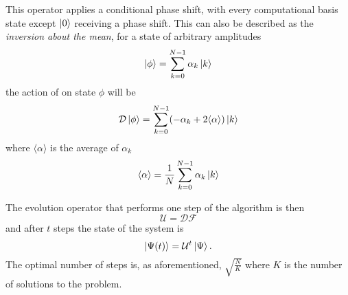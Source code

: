           This operator applies a conditional phase shift, with every computational basis state except $\ket{0}$ receiving a phase shift. This can also be described as the \textit{inversion about the mean}, for a state of arbitrary amplitudes
                    \begin{equation}
                        \ket{\phi} = \sum_{k=0}^{N-1} \alpha_k\ket{k}
                    \end{equation}
         the action of  on state $\phi$ will be
                     \begin{equation}
                         \mathcal{D}\ket{\phi} = \sum_{k=0}^{N-1}(-\alpha_k + 2\langle \alpha \rangle)\ket{k}
                    \end{equation}
         where $\langle \alpha \rangle$ is the average of $\alpha_k$
                    \begin{equation}
                        \langle \alpha \rangle = \frac{1}{N} \sum_{k=0}^{N-1} \alpha_k\ket{k}
                    \end{equation}
                    \par
        The evolution operator that performs one step of the algorithm is then
                    \begin{equation}
                        \mathcal{U} = \mathcal{D}\mathcal{F}
                    \end{equation}
         and after $t$ steps the state of the system is
                    \begin{equation}
                        \ket{\Psi(t)} = \mathcal{U}^t\ket{\Psi}.
                    \end{equation}
        The optimal number of steps is, as aforementioned, $\sqrt{\frac{N}{K}}$ where $K$ is the number of solutions to the problem.
